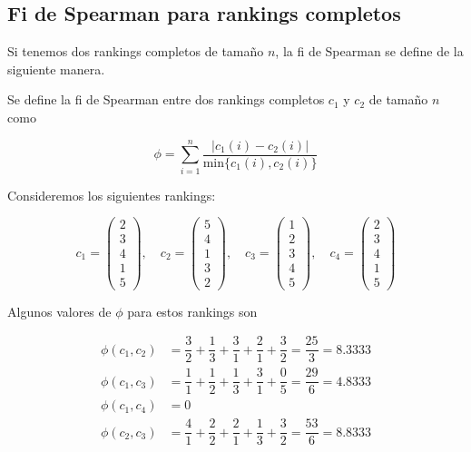 \subsection{Fi de Spearman para rankings completos}

Si tenemos dos rankings completos de tamaño $n$, la fi de Spearman se define de la siguiente manera.

\begin{defi}
Se define la fi de Spearman entre dos rankings completos $c_1$ y $c_2$ de tamaño $n$ como 

\begin{equation}
\phi = \sum\limits_{i=1}^{n} \dfrac{|c_1(i) - c_2(i)|}{\mathrm{min}\{c_1(i), c_2(i)\}}
\end{equation}
\end{defi}

\begin{ejemplo}
Consideremos los siguientes rankings:

\begin{equation*}
c_1 = \left( \begin{array}{c}
2\\
3\\
4\\
1\\
5
\end{array} \right), \quad
c_2 = \left( \begin{array}{c}
5\\
4\\
1\\
3\\
2
\end{array} \right), \quad
c_3 = \left( \begin{array}{c}
1\\
2\\
3\\
4\\
5
\end{array} \right), \quad
c_4 = \left( \begin{array}{c}
2\\
3\\
4\\
1\\
5
\end{array} \right)
\end{equation*}

Algunos valores de $\phi$ para estos rankings son

\begin{align*}
\phi(c_1, c_2) & = \dfrac{3}{2} + \dfrac{1}{3} + \dfrac{3}{1} + \dfrac{2}{1} + \dfrac{3}{2} = \dfrac{25}{3} = 8.3333\\
\phi(c_1, c_3) & = \dfrac{1}{1} + \dfrac{1}{2} + \dfrac{1}{3} + \dfrac{3}{1} + \dfrac{0}{5} = \dfrac{29}{6} = 4.8333\\
\phi(c_1, c_4) & = 0\\
\phi(c_2, c_3) & = \dfrac{4}{1} + \dfrac{2}{2} + \dfrac{2}{1} + \dfrac{1}{3} + \dfrac{3}{2} = \dfrac{53}{6} = 8.8333
\end{align*}  
\end{ejemplo}

